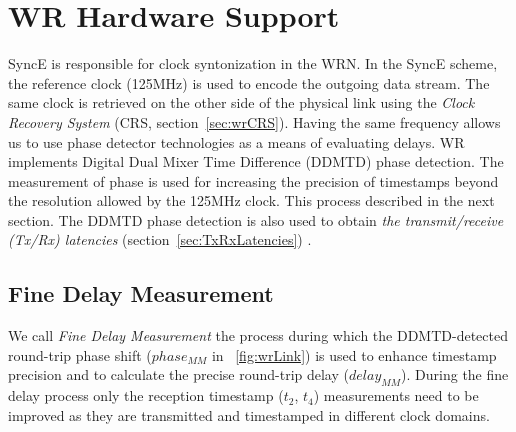 
\section{WR Hardware Support}
\label{sec:hwSupport}

SyncE is responsible for clock syntonization in the WRN. In the SyncE scheme, the 
reference clock (125MHz) is used to encode the outgoing data
stream. The same clock is retrieved on the other side of the physical
link using the \textit{Clock Recovery System} (CRS, section~\ref{sec:wrCRS}). 
Having the same frequency allows us to use phase detector technologies as a means of evaluating
delays. WR implements Digital Dual Mixer Time Difference (DDMTD) \cite{biblio:WRproject}
phase detection. The measurement of phase is used for 
increasing the precision of timestamps beyond the resolution allowed by the 125MHz clock.
This process  described in the next section. 
The DDMTD phase detection is also used to obtain 
\textit{the transmit/receive (Tx/Rx) latencies} (section~\ref{sec:TxRxLatencies})
.



\subsection{Fine Delay Measurement}
\label{sec:fineDelay}
We call \textit{Fine Delay Measurement} the process during which the DDMTD-detected round-trip phase
shift ($phase_{MM}$ in \figurename~\ref{fig:wrLink}) is used to enhance 
timestamp precision and to calculate the precise round-trip delay 
($delay_{MM}$). 
During the fine delay process only the reception timestamp ($t_2$, $t_4$) 
measurements need to be improved as they are transmitted and timestamped in
different clock domains.

